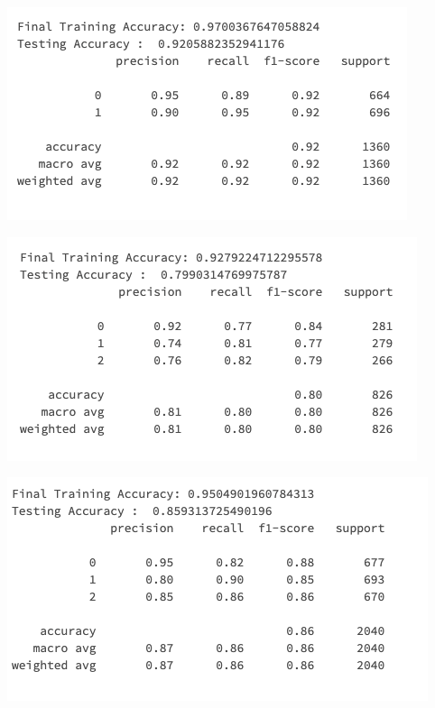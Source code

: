\documentclass[12pt]{article}
\begin{document}
\begin{multicols*}{2}
\begin{center}
    \includegraphics[scale=0.4]{../screenshot/Overlapping/score01.png}

		\includegraphics[scale=0.4]{../screenshot/Non-Overlapping/score012.png}

		\includegraphics[scale=0.4]{../screenshot/Overlapping/score012.png}  
  \end{center}


\end{multicols*}
\end{document}
